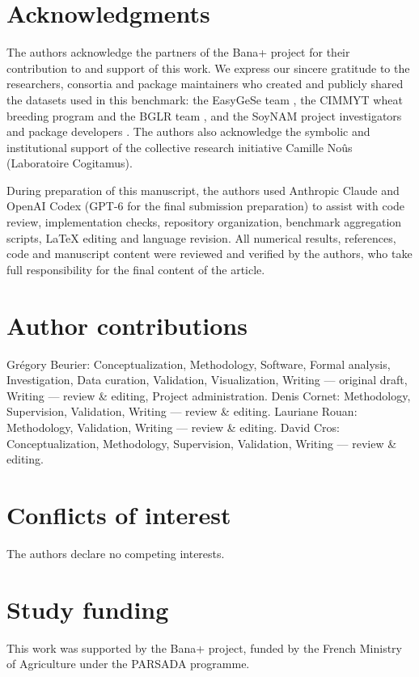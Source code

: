 \documentclass[11pt]{article}
\theoremstyle{plain}
\theoremstyle{remark}
\begin{document}
\section*{Acknowledgments}
The authors acknowledge the partners of the Bana+ project for their contribution
to and support of this work. We express our sincere gratitude to the researchers,
consortia and package maintainers who created and publicly shared the datasets
used in this benchmark: the EasyGeSe team \citep{quesada2025easygese}, the
CIMMYT wheat breeding program and the BGLR team \citep{crossa2010,perez2014bglr},
and the SoyNAM project investigators and package developers
\citep{xavier2016soynam}. The authors also acknowledge the symbolic and
institutional support of the collective research initiative Camille No\^us
(Laboratoire Cogitamus).

During preparation of this manuscript, the authors used Anthropic Claude and OpenAI Codex (GPT-6 for the final submission preparation) to assist with code review, implementation checks, repository organization, benchmark aggregation scripts, LaTeX editing and language revision. All numerical results, references, code and manuscript content were reviewed and verified by the authors, who take full responsibility for the final content of the article.


\section*{Author contributions}
Grégory Beurier: Conceptualization, Methodology, Software, Formal analysis, Investigation, Data curation, Validation, Visualization, Writing --- original draft, Writing --- review \& editing, Project administration.
Denis Cornet: Methodology, Supervision, Validation, Writing --- review \& editing.
Lauriane Rouan: Methodology, Validation, Writing --- review \& editing.
David Cros: Conceptualization, Methodology, Supervision, Validation, Writing --- review \& editing.

\section*{Conflicts of interest}
The authors declare no competing interests.

\section*{Study funding}
This work was supported by the Bana+ project, funded by the French Ministry of
Agriculture under the PARSADA programme.



\end{document}
